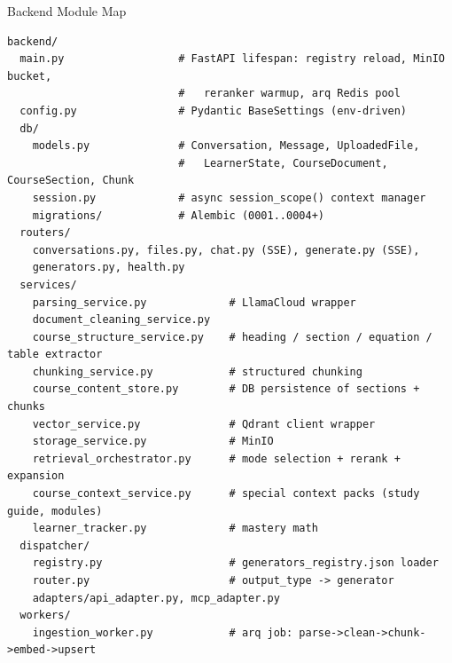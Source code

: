 \documentclass[aspectratio=169, 10pt]{beamer}
\begin{document}
\begin{frame}[fragile]{Backend Module Map}
  \scriptsize
\begin{verbatim}
backend/
  main.py                  # FastAPI lifespan: registry reload, MinIO bucket,
                           #   reranker warmup, arq Redis pool
  config.py                # Pydantic BaseSettings (env-driven)
  db/
    models.py              # Conversation, Message, UploadedFile,
                           #   LearnerState, CourseDocument, CourseSection, Chunk
    session.py             # async session_scope() context manager
    migrations/            # Alembic (0001..0004+)
  routers/
    conversations.py, files.py, chat.py (SSE), generate.py (SSE),
    generators.py, health.py
  services/
    parsing_service.py             # LlamaCloud wrapper
    document_cleaning_service.py
    course_structure_service.py    # heading / section / equation / table extractor
    chunking_service.py            # structured chunking
    course_content_store.py        # DB persistence of sections + chunks
    vector_service.py              # Qdrant client wrapper
    storage_service.py             # MinIO
    retrieval_orchestrator.py      # mode selection + rerank + expansion
    course_context_service.py      # special context packs (study guide, modules)
    learner_tracker.py             # mastery math
  dispatcher/
    registry.py                    # generators_registry.json loader
    router.py                      # output_type -> generator
    adapters/api_adapter.py, mcp_adapter.py
  workers/
    ingestion_worker.py            # arq job: parse->clean->chunk->embed->upsert
\end{verbatim}
\end{frame}
\end{document}
